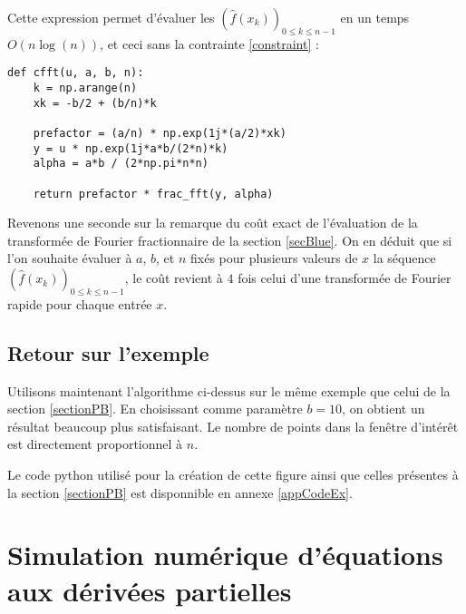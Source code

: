 \documentclass{article}
\begin{document}
Cette expression permet d'évaluer les $(\hat{f}(x_k))_{0 \le k \le n-1}$ en un temps $O(n\log(n))$, et ceci sans la contrainte \eqref{constraint} : 

\begin{verbatim}
def cfft(u, a, b, n):
    k = np.arange(n)
    xk = -b/2 + (b/n)*k
    
    prefactor = (a/n) * np.exp(1j*(a/2)*xk)
    y = u * np.exp(1j*a*b/(2*n)*k)
    alpha = a*b / (2*np.pi*n*n)
    
    return prefactor * frac_fft(y, alpha)
\end{verbatim}

Revenons une seconde sur la remarque du coût exact de l'évaluation de la transformée de Fourier fractionnaire de la section \ref{secBlue}. 
On en déduit que si l'on souhaite évaluer à $a$, $b$, et $n$ fixés pour plusieurs valeurs de $x$ la séquence $(\hat{f}(x_k))_{0 \le k \le n-1}$, le coût revient à $4$ fois celui d'une transformée de Fourier rapide pour chaque entrée $x$. 

\subsection{Retour sur l'exemple}

Utilisons maintenant l'algorithme ci-dessus sur le même exemple que celui de la section \ref{sectionPB}. En choisissant comme paramètre $b=10$, on obtient un résultat beaucoup plus satisfaisant. Le nombre de points dans la fenêtre d'intérêt est directement proportionnel à $n$.

\begin{center}
\end{center}

Le code python utilisé pour la création de cette figure ainsi que celles présentes à la section \ref{sectionPB} est disponnible en annexe \ref{appCodeEx}.

\section{Simulation numérique d'équations aux dérivées partielles}
\end{document}
